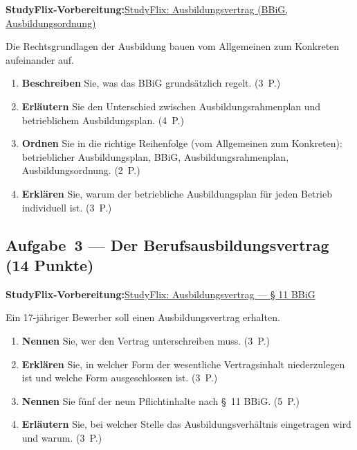 \documentclass[11pt, a4paper]{article}
\begin{document}
\noindent\textbf{\color{bfwAccent}StudyFlix-Vorbereitung:}\enspace \href{https://studyflix.de/ausbildung/karriere-ausbildung/ausbildungsvertrag-4788}{StudyFlix: Ausbildungsvertrag (BBiG, Ausbildungsordnung)}

\medskip
Die Rechtsgrundlagen der Ausbildung bauen vom Allgemeinen zum Konkreten aufeinander auf.

\begin{enumerate}[label=(\alph*)]
  \item \textbf{Beschreiben} Sie, was das BBiG grundsätzlich regelt. \hfill (3~P.)
  \item \textbf{Erläutern} Sie den Unterschied zwischen Ausbildungsrahmenplan und betrieblichem Ausbildungsplan. \hfill (4~P.)
  \item \textbf{Ordnen} Sie in die richtige Reihenfolge (vom Allgemeinen zum Konkreten): betrieblicher Ausbildungsplan, BBiG, Ausbildungsrahmenplan, Ausbildungsordnung. \hfill (2~P.)
  \item \textbf{Erklären} Sie, warum der betriebliche Ausbildungsplan für jeden Betrieb individuell ist. \hfill (3~P.)
\end{enumerate}

\subsection*{Aufgabe~3 --- Der Berufsausbildungsvertrag (14 Punkte)}

\noindent\textbf{\color{bfwAccent}StudyFlix-Vorbereitung:}\enspace \href{https://studyflix.de/ausbildung/karriere-ausbildung/ausbildungsvertrag-4788}{StudyFlix: Ausbildungsvertrag --- § 11 BBiG}

\medskip
Ein 17-jähriger Bewerber soll einen Ausbildungsvertrag erhalten.

\begin{enumerate}[label=(\alph*)]
  \item \textbf{Nennen} Sie, wer den Vertrag unterschreiben muss. \hfill (3~P.)
  \item \textbf{Erklären} Sie, in welcher Form der wesentliche Vertragsinhalt niederzulegen ist und welche Form ausgeschlossen ist. \hfill (3~P.)
  \item \textbf{Nennen} Sie fünf der neun Pflichtinhalte nach \S~11 BBiG. \hfill (5~P.)
  \item \textbf{Erläutern} Sie, bei welcher Stelle das Ausbildungsverhältnis eingetragen wird und warum. \hfill (3~P.)
\end{enumerate}
\end{document}

